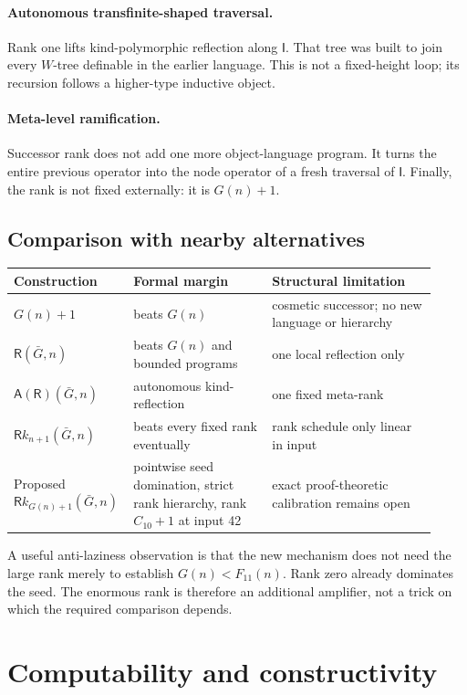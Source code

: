 \documentclass[11pt,oneside]{article}
\theoremstyle{definition}
\newcommand{\Index}{\mathsf I}
\newcommand{\Reflect}{\mathsf R}
\newcommand{\Auto}{\mathsf A}
\newcommand{\Ram}{\mathsf Rk}
\begin{document}
\paragraph{Autonomous transfinite-shaped traversal.}
Rank one lifts kind-polymorphic reflection along $\Index$.  That tree was built
to join every $W$-tree definable in the earlier language.  This is not a
fixed-height loop; its recursion follows a higher-type inductive object.

\paragraph{Meta-level ramification.}
Successor rank does not add one more object-language program.  It turns the
entire previous operator into the node operator of a fresh traversal of
$\Index$.  Finally, the rank is not fixed externally: it is $G(n)+1$.

\subsection{Comparison with nearby alternatives}

\begin{longtable}{@{}p{0.22\linewidth}p{0.32\linewidth}p{0.38\linewidth}@{}}
\toprule
Construction & Formal margin & Structural limitation \\
\midrule
\endhead
$G(n)+1$ & beats $G(n)$ & cosmetic successor; no new language or hierarchy \\
$\Reflect(\bar G,n)$ & beats $G(n)$ and bounded programs & one local reflection only \\
$\Auto(\Reflect)(\bar G,n)$ & autonomous kind-reflection & one fixed meta-rank \\
$\Ram_{n+1}(\bar G,n)$ & beats every fixed rank eventually & rank schedule only linear in input \\
Proposed $\Ram_{G(n)+1}(\bar G,n)$ & pointwise seed domination, strict rank hierarchy, rank $C_{10}+1$ at input 42 & exact proof-theoretic calibration remains open \\
\bottomrule
\end{longtable}

A useful anti-laziness observation is that the new mechanism does not need the
large rank merely to establish $G(n)<F_{11}(n)$.  Rank zero already dominates
the seed.  The enormous rank is therefore an additional amplifier, not a trick
on which the required comparison depends.

\section{Computability and constructivity}
\end{document}
